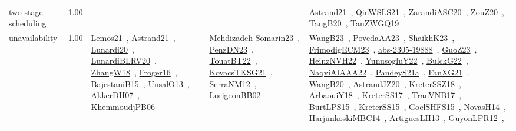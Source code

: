 {\begin{longtable}{p{3cm}r>{\raggedright\arraybackslash}p{6cm}>{\raggedright\arraybackslash}p{6cm}>{\raggedright\arraybackslash}p{8cm}}
\index{two-stage scheduling}\index{Concepts!two-stage scheduling}two-stage scheduling &  1.00 &  &  & \href{../works/Astrand21.pdf}{Astrand21}~\cite{Astrand21}, \href{../works/QinWSLS21.pdf}{QinWSLS21}~\cite{QinWSLS21}, \href{../works/ZarandiASC20.pdf}{ZarandiASC20}~\cite{ZarandiASC20}, \href{../works/ZouZ20.pdf}{ZouZ20}~\cite{ZouZ20}, \href{../works/TangB20.pdf}{TangB20}~\cite{TangB20}, \href{../works/TanZWGQ19.pdf}{TanZWGQ19}~\cite{TanZWGQ19}\\
\index{unavailability}\index{Concepts!unavailability}unavailability &  1.00 & \href{../works/Lemos21.pdf}{Lemos21}~\cite{Lemos21}, \href{../works/Astrand21.pdf}{Astrand21}~\cite{Astrand21}, \href{../works/Lunardi20.pdf}{Lunardi20}~\cite{Lunardi20}, \href{../works/LunardiBLRV20.pdf}{LunardiBLRV20}~\cite{LunardiBLRV20}, \href{../works/ZhangW18.pdf}{ZhangW18}~\cite{ZhangW18}, \href{../works/Froger16.pdf}{Froger16}~\cite{Froger16}, \href{../works/BajestaniB15.pdf}{BajestaniB15}~\cite{BajestaniB15}, \href{../works/UnsalO13.pdf}{UnsalO13}~\cite{UnsalO13}, \href{../works/AkkerDH07.pdf}{AkkerDH07}~\cite{AkkerDH07}, \href{../works/KhemmoudjPB06.pdf}{KhemmoudjPB06}~\cite{KhemmoudjPB06} & \href{../works/Mehdizadeh-Somarin23.pdf}{Mehdizadeh-Somarin23}~\cite{Mehdizadeh-Somarin23}, \href{../works/PenzDN23.pdf}{PenzDN23}~\cite{PenzDN23}, \href{../works/TouatBT22.pdf}{TouatBT22}~\cite{TouatBT22}, \href{../works/KovacsTKSG21.pdf}{KovacsTKSG21}~\cite{KovacsTKSG21}, \href{../works/SerraNM12.pdf}{SerraNM12}~\cite{SerraNM12}, \href{../works/LorigeonBB02.pdf}{LorigeonBB02}~\cite{LorigeonBB02} & \href{../works/WangB23.pdf}{WangB23}~\cite{WangB23}, \href{../works/PovedaAA23.pdf}{PovedaAA23}~\cite{PovedaAA23}, \href{../works/ShaikhK23.pdf}{ShaikhK23}~\cite{ShaikhK23}, \href{../works/FrimodigECM23.pdf}{FrimodigECM23}~\cite{FrimodigECM23}, \href{../works/abs-2305-19888.pdf}{abs-2305-19888}~\cite{abs-2305-19888}, \href{../works/GuoZ23.pdf}{GuoZ23}~\cite{GuoZ23}, \href{../works/HeinzNVH22.pdf}{HeinzNVH22}~\cite{HeinzNVH22}, \href{../works/YunusogluY22.pdf}{YunusogluY22}~\cite{YunusogluY22}, \href{../works/BulckG22.pdf}{BulckG22}~\cite{BulckG22}, \href{../works/NaqviAIAAA22.pdf}{NaqviAIAAA22}~\cite{NaqviAIAAA22}, \href{../works/PandeyS21a.pdf}{PandeyS21a}~\cite{PandeyS21a}, \href{../works/FanXG21.pdf}{FanXG21}~\cite{FanXG21}, \href{../works/WangB20.pdf}{WangB20}~\cite{WangB20}, \href{../works/AstrandJZ20.pdf}{AstrandJZ20}~\cite{AstrandJZ20}, \href{../works/KreterSSZ18.pdf}{KreterSSZ18}~\cite{KreterSSZ18}, \href{../works/ArbaouiY18.pdf}{ArbaouiY18}~\cite{ArbaouiY18}, \href{../works/KreterSS17.pdf}{KreterSS17}~\cite{KreterSS17}, \href{../works/TranVNB17.pdf}{TranVNB17}~\cite{TranVNB17}, \href{../works/BurtLPS15.pdf}{BurtLPS15}~\cite{BurtLPS15}, \href{../works/KreterSS15.pdf}{KreterSS15}~\cite{KreterSS15}, \href{../works/GoelSHFS15.pdf}{GoelSHFS15}~\cite{GoelSHFS15}, \href{../works/NovasH14.pdf}{NovasH14}~\cite{NovasH14}, \href{../works/HarjunkoskiMBC14.pdf}{HarjunkoskiMBC14}~\cite{HarjunkoskiMBC14}, \href{../works/ArtiguesLH13.pdf}{ArtiguesLH13}~\cite{ArtiguesLH13}, \href{../works/GuyonLPR12.pdf}{GuyonLPR12}~\cite{GuyonLPR12}, 
\end{longtable}}
